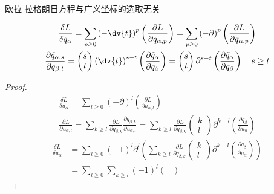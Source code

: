 \documentclass[12pt, a4paper, oneside, UTF8]{ctexbook}  %
\newcommand{\pa}{\partial}
\begin{document}
\begin{thm}
    欧拉-拉格朗日方程与广义坐标的选取无关
    \begin{yzh}
\begin{gather*}
            \frac{\delta L}{\delta q_\alpha}=
            \sum_{p \geq 0}\left(-\dv{t}\right)^p
            \left(\frac{\pa L}{\pa q_{\alpha,p}}\right)=
            \sum_{p \geq 0}\left(-\pa \right)^p
            \left(\frac{\pa L}{\pa q_{\alpha,p}}\right)
            \\
\frac{\partial\tilde{q}_{\alpha, s}}{\partial q_{\beta,t}}=
\begin{pmatrix}
s \\
t
\end{pmatrix}
\left(\dv{t}\right)^{s-t}
\left(\frac{\partial\tilde{q}_\alpha}{\partial q_\beta}\right)=
\begin{pmatrix}
s \\
t
\end{pmatrix}
\pa^{s-t}
\left(\frac{\partial\tilde{q}_\alpha}{\partial q_\beta}\right)
\quad s\geq t
\end{gather*}
    \end{yzh}
\begin{proof}
    \begin{gather*}
        \frac{\delta L}{\delta u_\alpha}=
        \sum_{l \geq 0}\left(-\pa \right)^l
        \left(\frac{\pa L}{\pa u_{\alpha,l}}\right)\\
        \frac{\pa L}{\pa u_{\alpha,l}}=\sum_{k\geq l}\frac{\pa L}{\pa q_{\beta,k}}
        \frac{\pa q_{\beta,k}}{\pa u_{\alpha,l}}=\sum_{k\geq l}\frac{\pa L}{\pa q_{\beta,k}}
        \begin{pmatrix}
        k \\
        l
        \end{pmatrix}
        \pa^{k-l}
        \left(\frac{\partial q_\beta}{\partial u_\alpha}\right) 
    \end{gather*}
    \begin{align*}
        \frac{\delta L}{\delta u_\alpha}&=
        \sum_{l \geq 0}\left(-1\right)^l\pa^l
        \left(\sum_{k\geq l}\frac{\pa L}{\pa q_{\beta,k}}
        \begin{pmatrix}
        k \\
        l
        \end{pmatrix}
        \pa^{k-l}
        \left(\frac{\partial q_\beta}{\partial u_\alpha}\right) \right)\\
&=\sum_{l \geq 0}\sum_{k\geq l}\left(-1\right)^l
\begin{pmatrix}

\end{pmatrix}
\end{align*}
\end{proof}
\end{thm}
\end{document}
